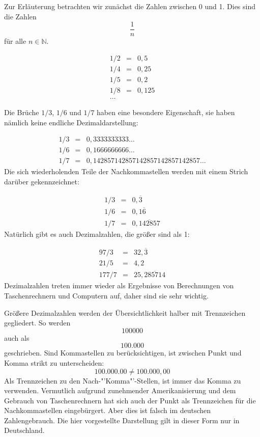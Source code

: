Zur Erläuterung betrachten wir zunächst die Zahlen zwischen 0 und 1. Dies sind die Zahlen 
\[ \frac{1}{n}\] für alle $n\in \mathbb{N}$. 

\begin{eqnarray*}
1/2 &=& 0,5 \\
1/4 &=& 0,25 \\
1/5 &=& 0,2 \\
1/8 &=& 0,125 \\
\dots
\end{eqnarray*}

Die Brüche $1/3$, $1/6$ und $1/7$ haben eine besondere Eigenschaft, sie haben nämlich keine endliche Dezimaldarstellung:

\begin{eqnarray*}
1/3 &=& 0,3333333333\dots \\
1/6 &=& 0,1666666666\dots \\
1/7 &=& 0,142857142857142857142857142857\dots
\end{eqnarray*}
Die sich wiederholenden Teile der Nachkommastellen werden mit einem Strich darüber gekennzeichnet:

\begin{eqnarray*}
1/3 &=& 0,\overline{3} \\
1/6 &=& 0,1\overline{6} \\
1/7 &=& 0,\overline{142857}
\end{eqnarray*}
Natürlich gibt es auch Dezimalzahlen, die größer sind als 1:

\begin{eqnarray*}
97/3 &=& 32,\overline{3} \\
21/5 &=& 4,2 \\
177/7 &=& 25,\overline{285714}
\end{eqnarray*}
Dezimalzahlen treten immer wieder als Ergebnisse von Berechnungen von Taschenrechnern und Computern auf, daher sind sie sehr wichtig. 

Größere Dezimalzahlen werden der Übersichtlichkeit halber mit Trennzeichen gegliedert. So werden 
\[100000\]
auch als
\[100.000\]
geschrieben. Sind Kommastellen zu berücksichtigen, ist zwischen Punkt und Komma strikt zu unterscheiden:
\[100.000.00 \ne 100.000,00\]
Als Trennzeichen zu den Nach-"'Komma"'-Stellen, ist immer das Komma zu verwenden. Vermutlich aufgrund zunehmender Amerikanisierung und dem Gebrauch von Taschenrechnern hat sich auch der Punkt als Trennzeichen für die Nachkommastellen eingebürgert. Aber dies ist falsch im deutschen Zahlengebrauch. Die hier vorgestellte Darstellung gilt in dieser Form nur in Deutschland. 

